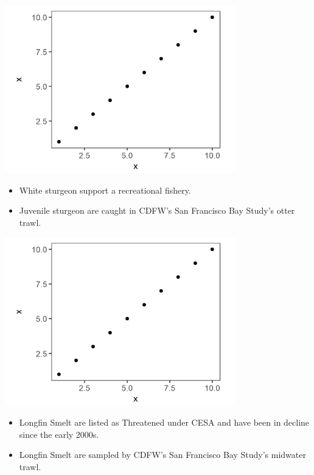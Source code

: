 \documentclass[]{article}\usepackage[]{graphicx}\usepackage[]{color}
\begin{document}
\begin{Row}
  \begin{Cell}{1}
    {\large 
      \begin{center}
        \includegraphics[width=10cm,align=m]{figures/otherfish/placeholder_fig.png}
        \begin{itemize}[leftmargin=1.5cm,rightmargin=1cm,topsep=10pt]
          \item White sturgeon support a recreational fishery.
          \item Juvenile sturgeon are caught in CDFW's San Francisco Bay Study's otter trawl.
        \end{itemize}
      \end{center}
    }
  \end{Cell}
  \begin{Cell}{1}
    {\large 
      \begin{center}
        \includegraphics[width=10cm,align=m]{figures/otherfish/placeholder_fig.png}
        \begin{itemize}[leftmargin=1.5cm,rightmargin=1cm,topsep=10pt]
          \item Longfin Smelt are listed as Threatened under CESA and have been in decline 
          since the early 2000s. 
          \item Longfin Smelt are sampled by CDFW’s San Francisco Bay Study's midwater trawl.
        \end{itemize}
      \end{center}
    }
  \end{Cell}
\end{Row}
\end{document}
